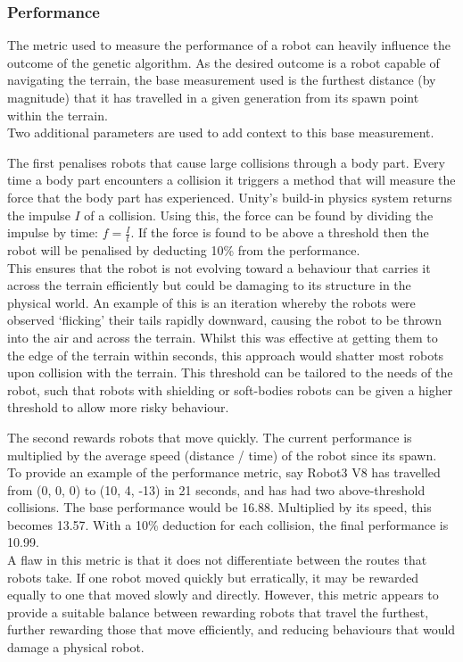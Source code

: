 \documentclass{article}
\begin{document}
\subsubsection{Performance}
The metric used to measure the performance of a robot can heavily influence the outcome of the genetic algorithm. As the desired outcome is a robot capable of navigating the terrain, the base measurement used is the furthest distance (by magnitude) that it has travelled in a given generation from its spawn point within the terrain. 
\\[1\baselineskip]
Two additional parameters are used to add context to this base measurement. 

The first penalises robots that cause large collisions through a body part. Every time a body part encounters a collision it triggers a method that will measure the force that the body part has experienced. Unity's build-in physics system returns the impulse $I$ of a collision. Using this, the force can be found by dividing the impulse by time: {\Large $f = \frac{I}{t}$}. 
If the force is found to be above a threshold then the robot will be penalised by deducting 10\% from the performance. \\
This ensures that the robot is not evolving toward a behaviour that carries it across the terrain efficiently but could be damaging to its structure in the physical world. An example of this is an iteration whereby the robots were observed ‘flicking’ their tails rapidly downward, causing the robot to be thrown into the air and across the terrain. Whilst this was effective at getting them to the edge of the terrain within seconds, this approach would shatter most robots upon collision with the terrain. This threshold can be tailored to the needs of the robot, such that robots with shielding or soft-bodies robots can be given a higher threshold to allow more risky behaviour.

The second rewards robots that move quickly. The current performance is multiplied by the average speed (distance / time) of the robot since its spawn. 
\\[1\baselineskip] 
To provide an example of the performance metric, say Robot3 V8 has travelled from (0, 0, 0) to (10, 4, -13) in 21 seconds, and has had two above-threshold collisions. The base performance would be 16.88. Multiplied by its speed, this becomes 13.57. With a 10\% deduction for each collision, the final performance is 10.99. \\
A flaw in this metric is that it does not differentiate between the routes that robots take. If one robot moved quickly but erratically, it may be rewarded equally to one that moved slowly and directly. However, this metric appears to provide a suitable balance between rewarding robots that travel the furthest, further rewarding those that move efficiently, and reducing behaviours that would damage a physical robot. \\
\end{document}
